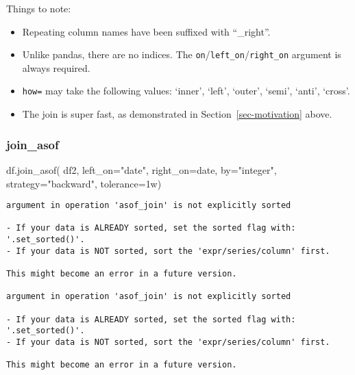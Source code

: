 \documentclass[
  letterpaper,
  DIV=11,
  numbers=noendperiod]{scrartcl}
\newenvironment{Shaded}{\begin{snugshade}}{\end{snugshade}}
\newcommand{\NormalTok}[1]{\textcolor[rgb]{0.00,0.23,0.31}{#1}}
\newcommand{\OperatorTok}[1]{\textcolor[rgb]{0.37,0.37,0.37}{#1}}
\newcommand{\StringTok}[1]{\textcolor[rgb]{0.13,0.47,0.30}{#1}}
\providecommand{\tightlist}{%
  \setlength{\itemsep}{0pt}\setlength{\parskip}{0pt}}\usepackage{longtable,booktabs,array}
\begin{document}
Things to note:

\begin{itemize}
\tightlist
\item
  Repeating column names have been suffixed with ``\_right''.
\item
  Unlike pandas, there are no indices. The
  \texttt{on}/\texttt{left\_on}/\texttt{right\_on} argument is always
  required.
\item
  \texttt{how=} may take the following values: `inner', `left', `outer',
  `semi', `anti', `cross'.
\item
  The join is super fast, as demonstrated in
  Section~\ref{sec-motivation} above.
\end{itemize}

\hypertarget{join_asof}{%
\subsubsection{join\_asof}\label{join_asof}}

\begin{Shaded}
\begin{Highlighting}[]
\NormalTok{df.join\_asof(}
\NormalTok{    df2, }
\NormalTok{    left\_on}\OperatorTok{=}\StringTok{"date"}\NormalTok{, }
\NormalTok{    right\_on}\OperatorTok{=}\StringTok{\textquotesingle{}date\textquotesingle{}}\NormalTok{, }
\NormalTok{    by}\OperatorTok{=}\StringTok{"integer"}\NormalTok{, }
\NormalTok{    strategy}\OperatorTok{=}\StringTok{"backward"}\NormalTok{, }
\NormalTok{    tolerance}\OperatorTok{=}\StringTok{\textquotesingle{}1w\textquotesingle{}}\NormalTok{)}
\end{Highlighting}
\end{Shaded}

\begin{verbatim}
argument in operation 'asof_join' is not explicitly sorted

- If your data is ALREADY sorted, set the sorted flag with: '.set_sorted()'.
- If your data is NOT sorted, sort the 'expr/series/column' first.

This might become an error in a future version.
    
argument in operation 'asof_join' is not explicitly sorted

- If your data is ALREADY sorted, set the sorted flag with: '.set_sorted()'.
- If your data is NOT sorted, sort the 'expr/series/column' first.

This might become an error in a future version.
    
\end{verbatim}
\end{document}
